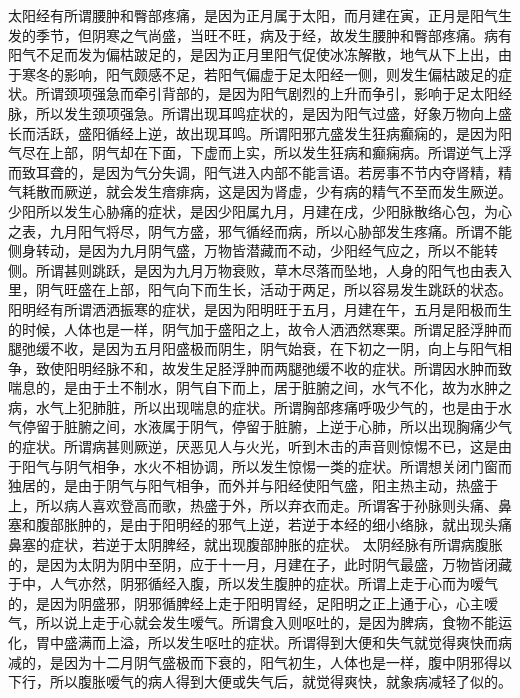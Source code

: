 \documentclass[12pt,UTF8]{ctexbook}
\begin{document}
太阳经有所谓腰肿和臀部疼痛，是因为正月属于太阳，而月建在寅，正月是阳气生发的季节，但阴寒之气尚盛，当旺不旺，病及于经，故发生腰肿和臀部疼痛。病有阳气不足而发为偏枯跛足的，是因为正月里阳气促使冰冻解散，地气从下上出，由于寒冬的影响，阳气颇感不足，若阳气偏虚于足太阳经一侧，则发生偏枯跛足的症状。所谓颈项强急而牵引背部的，是因为阳气剧烈的上升而争引，影响于足太阳经脉，所以发生颈项强急。所谓出现耳鸣症状的，是因为阳气过盛，好象万物向上盛长而活跃，盛阳循经上逆，故出现耳鸣。所谓阳邪亢盛发生狂病癫痫的，是因为阳气尽在上部，阴气却在下面，下虚而上实，所以发生狂病和癫痫病。所谓逆气上浮而致耳聋的，是因为气分失调，阳气进入内部不能言语。若房事不节内夺肾精，精气耗散而厥逆，就会发生瘖痱病，这是因为肾虚，少有病的精气不至而发生厥逆。
少阳所以发生心胁痛的症状，是因少阳属九月，月建在戌，少阳脉散络心包，为心之表，九月阳气将尽，阴气方盛，邪气循经而病，所以心胁部发生疼痛。所谓不能侧身转动，是因为九月阴气盛，万物皆潜藏而不动，少阳经气应之，所以不能转侧。所谓甚则跳跃，是因为九月万物衰败，草木尽落而坠地，人身的阳气也由表入里，阴气旺盛在上部，阳气向下而生长，活动于两足，所以容易发生跳跃的状态。
阳明经有所谓洒洒振寒的症状，是因为阳明旺于五月，月建在午，五月是阳极而生的时候，人体也是一样，阴气加于盛阳之上，故令人洒洒然寒栗。所谓足胫浮肿而腿弛缓不收，是因为五月阳盛极而阴生，阴气始衰，在下初之一阴，向上与阳气相争，致使阳明经脉不和，故发生足胫浮肿而两腿弛缓不收的症状。所谓因水肿而致喘息的，是由于土不制水，阴气自下而上，居于脏腑之间，水气不化，故为水肿之病，水气上犯肺脏，所以出现喘息的症状。所谓胸部疼痛呼吸少气的，也是由于水气停留于脏腑之间，水液属于阴气，停留于脏腑，上逆于心肺，所以出现胸痛少气的症状。所谓病甚则厥逆，厌恶见人与火光，听到木击的声音则惊惕不已，这是由于阳气与阴气相争，水火不相协调，所以发生惊惕一类的症状。所谓想关闭门窗而独居的，是由于阴气与阳气相争，而外并与阳经使阳气盛，阳主热主动，热盛于上，所以病人喜欢登高而歌，热盛于外，所以弃衣而走。所谓客于孙脉则头痛、鼻塞和腹部胀肿的，是由于阳明经的邪气上逆，若逆于本经的细小络脉，就出现头痛鼻塞的症状，若逆于太阴脾经，就出现腹部肿胀的症状。
太阴经脉有所谓病腹胀的，是因为太阴为阴中至阴，应于十一月，月建在子，此时阴气最盛，万物皆闭藏于中，人气亦然，阴邪循经入腹，所以发生腹肿的症状。所谓上走于心而为嗳气的，是因为阴盛邪，阴邪循脾经上走于阳明胃经，足阳明之正上通于心，心主嗳气，所以说上走于心就会发生嗳气。所谓食入则呕吐的，是因为脾病，食物不能运化，胃中盛满而上溢，所以发生呕吐的症状。所谓得到大便和失气就觉得爽快而病减的，是因为十二月阴气盛极而下衰的，阳气初生，人体也是一样，腹中阴邪得以下行，所以腹胀嗳气的病人得到大便或失气后，就觉得爽快，就象病减轻了似的。
\end{document}
